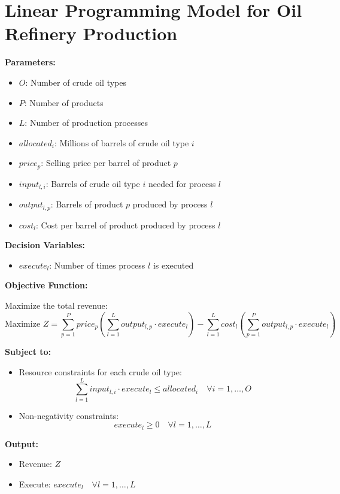 \documentclass{article}
\begin{document}
\section*{Linear Programming Model for Oil Refinery Production}

\textbf{Parameters:}

\begin{itemize}
    \item $O$: Number of crude oil types
    \item $P$: Number of products
    \item $L$: Number of production processes
    \item $allocated_i$: Millions of barrels of crude oil type $i$
    \item $price_p$: Selling price per barrel of product $p$
    \item $input_{l,i}$: Barrels of crude oil type $i$ needed for process $l$
    \item $output_{l,p}$: Barrels of product $p$ produced by process $l$
    \item $cost_l$: Cost per barrel of product produced by process $l$
\end{itemize}

\textbf{Decision Variables:}

\begin{itemize}
    \item $execute_l$: Number of times process $l$ is executed
\end{itemize}

\textbf{Objective Function:}

Maximize the total revenue:
\[
\text{Maximize } Z = \sum_{p=1}^{P} price_p \left( \sum_{l=1}^{L} output_{l,p} \cdot execute_l \right) - \sum_{l=1}^{L} cost_l \left( \sum_{p=1}^{P} output_{l,p} \cdot execute_l \right)
\]

\textbf{Subject to:}

\begin{itemize}
    \item Resource constraints for each crude oil type:
    \[
    \sum_{l=1}^{L} input_{l,i} \cdot execute_l \leq allocated_i \quad \forall i = 1, \ldots, O
    \]
    
    \item Non-negativity constraints:
    \[
    execute_l \geq 0 \quad \forall l = 1, \ldots, L
    \]
\end{itemize}

\textbf{Output:}

\begin{itemize}
    \item Revenue: $Z$
    \item Execute: $execute_l \quad \forall l = 1, \ldots, L$
\end{itemize}
\end{document}
